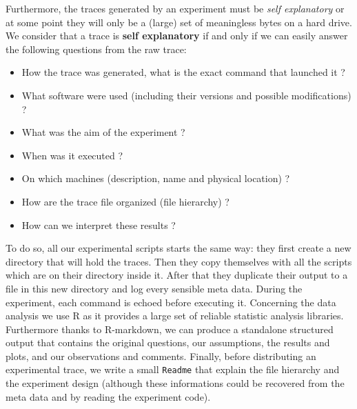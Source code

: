 Furthermore, the traces generated by an experiment must be \emph{self explanatory} or at some point they will only be a (large) set of meaningless bytes on a hard drive.
We consider that a trace is \textbf{self explanatory} if and only if we can easily answer the following questions from the raw trace:
\begin{itemize}
    \item How the trace was generated, what is the exact command that launched it ?
    \item What software were used (including their versions and possible modifications) ?
    \item What was the aim of the experiment ?
    \item When was it executed ?
    \item On which machines (description, name and physical location) ?
    \item How are the trace file organized (file hierarchy) ?
    \item How can we interpret these results ?
\end{itemize}
To do so, all our experimental scripts starts the same way: they first create a new directory that will hold the traces.
Then they copy themselves with all the scripts which are on their directory inside it.
After that they duplicate their output to a file in this new directory and log every sensible meta data.
During the experiment, each command is echoed before executing it.
Concerning the data analysis we use \gls{R} as it provides a large set of reliable statistic analysis libraries.
Furthermore thanks to \gls{R-markdown}, we can produce a standalone structured output that contains the original questions, our assumptions, the results and plots, and our observations and comments.
Finally, before distributing an experimental trace, we write a small \texttt{Readme} that explain the file hierarchy and the experiment design (although these informations could be recovered from the meta data and by reading the experiment code).

